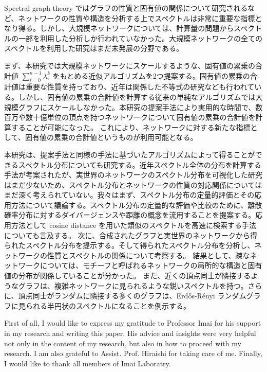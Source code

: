 \documentclass[senior,final,11pt]{iscs-thesis}
\begin{document}
\begin{jabstract}
    Spectral graph theory ではグラフの性質と固有値の関係について研究されるなど、ネットワークの性質や構造を分析する上でスペクトルは非常に重要な指標となり得る。しかし、大規模ネットワークについては、計算量の問題からスペクトルの一部を利用した分析しか行われていなかった。大規模ネットワークの全てのスペクトルを利用した研究はまだ未発展の分野である。

    まず、本研究では大規模ネットワークにスケールするような、固有値の累乗の合計値 $\sum_{i=0}^{n-1} \lambda_i^k$ をもとめる近似アルゴリズムを2つ提案する。固有値の累乗の合計値は重要な性質を持っており、近年は関係した不等式の研究なども行われている。しかし、固有値の累乗の合計値を計算する従来の単純なアルゴリズムでは大規模グラフにスケールしなかった。本研究の提案手法により実用的な時間で、数百万や数十億単位の頂点を持つネットワークについて固有値の累乗の合計値を計算することが可能になった。 これにより、ネットワークに対する新たな指標として、固有値の累乗の合計値というものが利用可能となる。

    本研究は、提案手法と同様の手法に基づいたアルゴリズムによって得ることができるスペクトル分布についても研究する。近年スペクトル全体の分布を計算する手法が考案されたが、実世界のネットワークのスペクトル分布を可視化した研究はまだ少ないため、スペクトル分布とネットワークの性質の対応関係についてはまだ深く考えられていない。我々はまず、スペクトル分布の定量的評価とその応用方法について議論する。スペクトル分布の定量的な評価や比較のために、離散確率分布に対するダイバージェンスや距離の概念を流用することを提案する。応用方法として cosine distance を用いた類似のスペクトルを高速に検索する手法についても言及する。 次に、合成されたグラフと実世界のネットワークから得られたスペクトル分布を提示する。そして得られたスペクトル分布を分析し、ネットワークの性質とスペクトルの関係について考察する。 結果として、疎なネットワークについては、モチーフと呼ばれるネットワークの局所的な構造と固有値の分布が関係していることが分かった。 また、近くの頂点同士が隣接するようなグラフは、複雑ネットワークに見られるような鋭いスペクトルを持つ。さらに、頂点同士がランダムに隣接する多くのグラフは、Erdős-Rényi ランダムグラフに見られる半円状のスペクトルになることを例示する。


\end{jabstract}
\maketitle

\begin{acknowledge}
    First of all, I would like to express my gratitude to Professor Imai for his support in my research and writing this paper. His advice and insights were very helpful not only in the content of my research, but also in how to proceed with my research. I am also grateful to Assist. Prof. Hiraishi for taking care of me. Finally, I would like to thank all members of Imai Laboratry.
\end{acknowledge}
\end{document}
